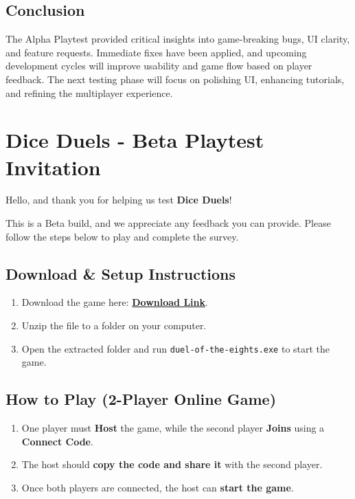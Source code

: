 \documentclass[12pt, titlepage]{article}
\begin{document}
\subsection{Conclusion}
The Alpha Playtest provided critical insights into game-breaking bugs, UI clarity, and feature requests. Immediate fixes have been applied, and upcoming development cycles will improve usability and game flow based on player feedback. The next testing phase will focus on polishing UI, enhancing tutorials, and refining the multiplayer experience.



\newpage

\section{Dice Duels - Beta Playtest Invitation}

Hello, and thank you for helping us test \textbf{Dice Duels}!

This is a Beta build, and we appreciate any feedback you can provide. Please follow the steps below to play and complete the survey.

\subsection{Download \& Setup Instructions}
\begin{enumerate}
    \item Download the game here: \href{https://drive.google.com/file/d/1MLTZWqBBJjXCT3Q7cvJJVNfackxiZBBO/view?usp=sharing}{\textbf{Download Link}}.
    \item Unzip the file to a folder on your computer.
    \item Open the extracted folder and run \texttt{duel-of-the-eights.exe} to start the game.
\end{enumerate}

\subsection{How to Play (2-Player Online Game)}
\begin{enumerate}
    \item One player must \textbf{Host} the game, while the second player \textbf{Joins} using a \textbf{Connect Code}.
    \item The host should \textbf{copy the code and share it} with the second player.
    \item Once both players are connected, the host can \textbf{start the game}.
\end{enumerate}
\end{document}
